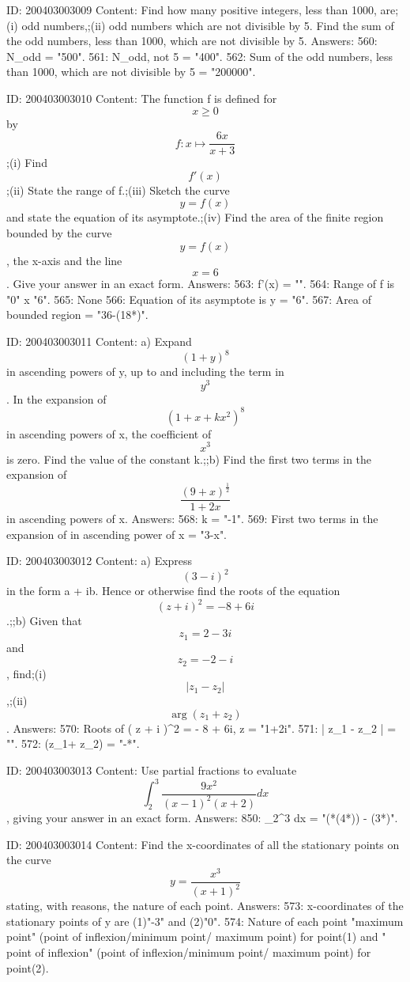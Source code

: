 \documentclass{article}
\begin{document}
ID: 200403003009
Content:
Find how many positive integers, less than 1000, are;(i) odd numbers,;(ii) odd numbers which are not divisible by 5. Find the sum of the odd numbers, less than 1000, which are not divisible by 5.  Answers:
560: N_{odd} = "500".
561: N_{odd}, not 5 = "400".
562: Sum of the odd numbers, less than 1000, which are not divisible by 5 = "200000".

ID: 200403003010
Content:
The function f is defined for $$x \geq  0$$ by $$ f: x \mapsto \frac{6x}{x+3} $$;(i) Find $$f'(x)$$;(ii) State the range of f.;(iii) Sketch the curve $$y = f(x)$$ and state the equation of its asymptote.;(iv) Find the area of the finite region bounded by the curve $$y = f(x)$$, the x-axis and the line $$x = 6$$. Give your answer in an exact form. Answers:
563: f'(x) = "".
564: Range of f is "0" \leq x \leq "6".
565: None
566: Equation of its asymptote is y = "6".
567: Area of bounded region = "36-(18*)".

ID: 200403003011
Content:
a)  Expand  $$(1 + y)^8 $$ in ascending powers of y, up to and including the term in  $$y^3 $$. In the expansion of  $$( 1 + x + kx^2  )^8 $$ in ascending powers of x, the coefficient of  $$x^3 $$ is zero. Find the value of the constant k.;;b) Find the first two terms in the expansion of  $$\frac{(9 + x)^{\frac{1}{2}}}{1 + 2x}$$ in ascending powers of x. Answers:
568: k = "-1".
569: First two terms in the expansion of   in ascending power of x = "3-x".

ID: 200403003012
Content:
a)  Express  $$(3 - i) ^2 $$ in the form a + ib. Hence or otherwise find the roots of the equation  $$( z + i )^2  =  - 8 + 6i$$.;;b) Given that  $$z_1  = 2 - 3i$$ and  $$z_2  =  - 2 - i$$, find;(i)  $$| z_1  - z_2  |$$,;(ii) $$\arg ( z_1  + z_2  )$$. Answers:
570: Roots of ( z + i )^2  =  - 8 + 6i, z = "1+2i".
571: | z_1  - z_2  | = "".
572: \arg(z_1+ z_2) = "-*\pi".

ID: 200403003013
Content:
Use partial fractions to evaluate  $$\int_2^3 \frac{9x^2}{( x - 1 )^2 ( x + 2 )}dx $$, giving your answer in an exact form. Answers:
850: \int_2^3  dx = "(*(4*)) - (3*)".

ID: 200403003014
Content:
Find the x-coordinates of all the stationary points on the curve  $$y = \frac{x^3}{(x + 1 )^2} $$ stating, with reasons, the nature of each point. Answers:
573: x-coordinates of the stationary points of y are (1)"-3" and (2)"0".
574: Nature of each point "maximum point" (point of inflexion/minimum point/ maximum point) for point(1) and " point of inflexion" (point of inflexion/minimum point/ maximum point) for point(2).
\end{document}
